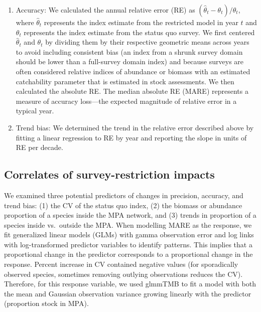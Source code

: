 \documentclass[12pt]{article}
\newcommand{\R}[1]{\label{#1}\linelabel{#1}}
\begin{document}
\begin{spacing}{1.4}
\begin{enumerate}
    \item Accuracy: We calculated the annual relative error (RE) as $(\hat{\theta}_t - \theta_t) / \theta_t$, where $\hat{\theta}_t$ represents the index estimate from the restricted model in year $t$ and $\theta_t$ represents the index estimate from the status quo survey. We first centered $\hat{\theta}_t$ and $\theta_t$ by dividing them by their respective geometric means across years to avoid including consistent bias (an index from a shrunk survey domain should be lower than a full-survey domain index) and because surveys are often considered relative indices of abundance or biomass with an estimated catchability parameter that is estimated in stock assessments. We then calculated the absolute RE. The median absolute RE (MARE) represents a measure of accuracy loss---the expected magnitude of relative error in a typical year.

    \item Trend bias: We determined the trend in the relative error described above by fitting a linear regression to RE by year and reporting the slope in units of RE per decade.

\end{enumerate}

\subsection*{Correlates of survey-restriction impacts}

We examined three potential predictors of changes in precision, accuracy, and trend bias:
(1) the CV of the status quo index, (2) the biomass or abundance proportion of a species inside the MPA network, and (3) trends in proportion of a species inside vs.\ outside the MPA.
When modelling MARE as the response, we fit generalized linear models (GLMs) with gamma observation error and log links with log-transformed predictor variables to identify patterns.
This implies that a proportional change in the predictor corresponds to a proportional change in the response.
\R{B9a}Percent increase in CV contained negative values (for sporadically observed species, sometimes removing outlying observations reduces the CV). Therefore, for this response variable, we used glmmTMB \citep{brooks2017} to fit a model with both the mean and Gaussian observation variance growing linearly with the predictor (proportion stock in MPA).


\end{spacing}
\end{document}
